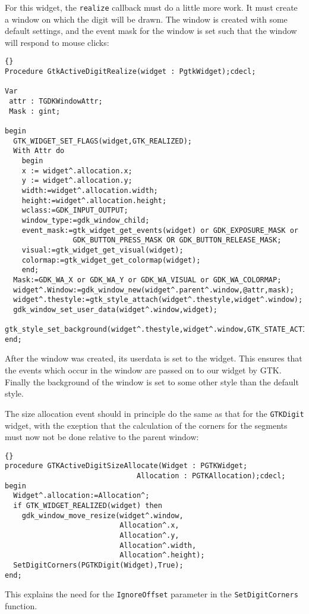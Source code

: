 \documentclass[10pt]{article}
\begin{document}
For this widget, the \lstinline|realize| callback must do a little more
work. It must create a window on which the digit will be drawn. The window
is created with some default settings, and the event mask for the window
is set such that the window will respond to mouse clicks:
\begin{lstlisting}{}
Procedure GtkActiveDigitRealize(widget : PgtkWidget);cdecl;

Var
 attr : TGDKWindowAttr;
 Mask : gint;
 
begin
  GTK_WIDGET_SET_FLAGS(widget,GTK_REALIZED);
  With Attr do
    begin
    x := widget^.allocation.x;
    y := widget^.allocation.y;
    width:=widget^.allocation.width;
    height:=widget^.allocation.height;
    wclass:=GDK_INPUT_OUTPUT;
    window_type:=gdk_window_child;
    event_mask:=gtk_widget_get_events(widget) or GDK_EXPOSURE_MASK or
                GDK_BUTTON_PRESS_MASK OR GDK_BUTTON_RELEASE_MASK;
    visual:=gtk_widget_get_visual(widget);
    colormap:=gtk_widget_get_colormap(widget);
    end;
  Mask:=GDK_WA_X or GDK_WA_Y or GDK_WA_VISUAL or GDK_WA_COLORMAP;
  widget^.Window:=gdk_window_new(widget^.parent^.window,@attr,mask);
  widget^.thestyle:=gtk_style_attach(widget^.thestyle,widget^.window);
  gdk_window_set_user_data(widget^.window,widget);  
  gtk_style_set_background(widget^.thestyle,widget^.window,GTK_STATE_ACTIVE);
end;
\end{lstlisting}
After the window was created, its userdata is set to the widget. This
ensures that the events which occur in the window are passed on to our 
widget by GTK. Finally the background of the window is set to some
other style than the default style.

The size allocation event should in principle do the same as that for the
\lstinline|GTKDigit| widget, with the exeption that the calculation of the
corners for the segments must now not be done relative to the parent window:
\begin{lstlisting}{}
procedure GTKActiveDigitSizeAllocate(Widget : PGTKWidget;
                               Allocation : PGTKAllocation);cdecl;
begin
  Widget^.allocation:=Allocation^;
  if GTK_WIDGET_REALIZED(widget) then
    gdk_window_move_resize(widget^.window,
                           Allocation^.x,
                           Allocation^.y,
                           Allocation^.width,
                           Allocation^.height);
  SetDigitCorners(PGTKDigit(Widget),True);
end;
\end{lstlisting}
This explains the need for the \lstinline|IgnoreOffset| parameter in the
\lstinline|SetDigitCorners| function.
\end{document}
